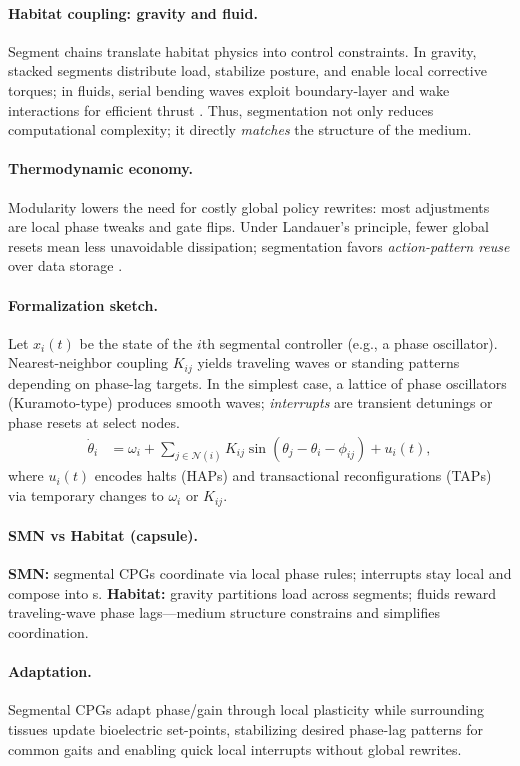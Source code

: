 \paragraph{Habitat coupling: gravity and fluid.}
Segment chains translate habitat physics into control constraints.
In gravity, stacked segments distribute load, stabilize posture, and enable local corrective torques; in fluids, serial bending waves exploit boundary-layer and wake interactions for efficient thrust \cite{Alexander2003PrinciplesLocomotion}.
Thus, segmentation not only reduces computational complexity; it directly \emph{matches} the structure of the medium.

\paragraph{Thermodynamic economy.}
Modularity lowers the need for costly global policy rewrites: most adjustments are local phase tweaks and gate flips.
Under Landauer's principle, fewer global resets mean less unavoidable dissipation; segmentation favors \emph{action-pattern reuse} over data storage \cite{Landauer1961Irreversibility,Bennett2003LandauerNotes,StillEtAl2012ThermoPrediction}.

\paragraph{Formalization sketch.}
Let $x_i(t)$ be the state of the $i$th segmental controller (e.g., a phase oscillator).
Nearest-neighbor coupling $K_{ij}$ yields traveling waves or standing patterns depending on phase-lag targets.
In the simplest case, a lattice of phase oscillators (Kuramoto-type) produces smooth waves; \emph{interrupts} are transient detunings or phase resets at select nodes.
\begin{align}
\dot{\theta}_i &= \omega_i + \sum_{j \in \mathcal{N}(i)} K_{ij} \sin(\theta_j - \theta_i - \phi_{ij}) + u_i(t),
\end{align}
where $u_i(t)$ encodes halts (HAPs) and transactional reconfigurations (TAPs) via temporary changes to $\omega_i$ or $K_{ij}$.

\paragraph{SMN vs Habitat (capsule).}
\textbf{SMN:} segmental CPGs coordinate via local phase rules; interrupts stay local and compose into \OAP{}s.
\textbf{Habitat:} gravity partitions load across segments; fluids reward traveling-wave phase lags—medium structure constrains and simplifies coordination.

\paragraph{Adaptation.}
Segmental CPGs adapt phase/gain through local plasticity while surrounding tissues update bioelectric set-points, stabilizing desired phase-lag patterns for common gaits and enabling quick local interrupts without global rewrites.
